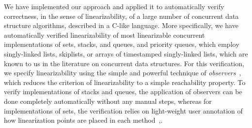 We have implemented our approach and applied it to automatically verify
correctness, in the sense of linearizability, of a large number of
concurrent data structure algorithms, described in a C-like language.
More specifically, we have automatically verified linearizability of 
most linearizable concurrent implementations
of sets, stacks, and queues, and priority queues,
which employ singly-linked lists, skiplists, or
arrays of timestamped singly-linked lists, which are known to us in
the literature on concurrent data structures.
For this verification, we specify linearizability
using the simple and powerful technique of
{\em observers}~\cite{AHHR:integrated:short,BEEH:icalp15,CHSV:aspect-oriented},
which reduces the criterion of linearizability to a simple reachability
property. To verify implementations of stacks and queues, 
the application of observers can be done completely automatically without
any manual steps, whereas for implementations of sets, the verification relies
on light-weight user annotation of how linearization points are placed in
each method~\cite{Quy:sas16},.

